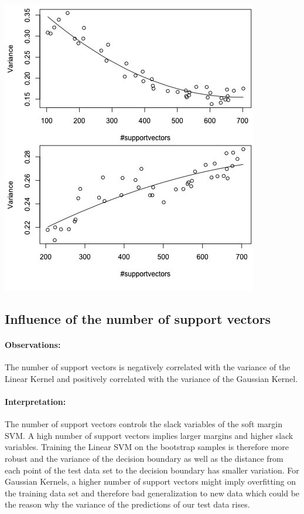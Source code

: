 \documentclass[a1,portrait]{a0poster}
\begin{document}
\begin{multicols}{3}
\begin{center}\vspace{1cm}
\includegraphics[width=1\linewidth]{abb/n_support.jpg}
\label{fig4}
\end{center}\vspace{1cm}


\subsection*{Influence of the number of support vectors}
\paragraph{Observations:}
The number of support vectors is negatively correlated with the variance of the Linear Kernel and positively correlated with the variance of the Gaussian Kernel.
\paragraph{Interpretation:}
The number of support vectors controls the slack variables of the soft margin SVM. A high number of support vectors implies larger margins and higher slack variables. Training the Linear SVM on the bootstrap samples is therefore more robust and the variance of the decision boundary as well as the distance from each point of the test data set to the decision boundary has smaller variation.
For Gaussian Kernels, a higher number of support vectors might imply overfitting on the training data set and therefore bad generalization to new data which could be the reason why the variance of the predictions of our test data rises.


\end{multicols}
\end{document}
